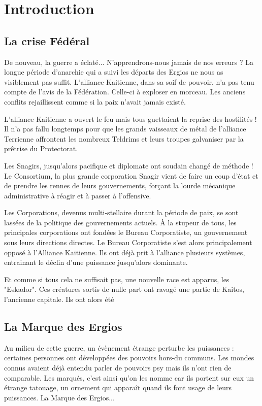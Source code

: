 \chapter*{Introduction}

\begin{multicols*}{2}

\section*{La crise Fédéral}

De nouveau, la guerre a éclaté... N'apprendrons-nous jamais de nos erreurs ? La longue période d'anarchie qui a suivi les départs des Ergios ne nous as visiblement pas suffit. L'alliance Kaitienne, dans sa soif de pouvoir, n'a pas tenu compte de l'avis de la Fédération. Celle-ci à exploser en morceau. Les anciens conflits rejaillissent comme si la paix n'avait jamais existé.

L'alliance Kaitienne a ouvert le feu mais tous guettaient la reprise des hostilités ! Il n'a pas fallu longtemps pour que les grands vaisseaux de métal de l'alliance Terrienne affrontent les nombreux Teldrims et leurs troupes galvaniser par la prêtrise du Protectorat.

Les Snagirs, jusqu'alors pacifique et diplomate ont soudain changé de méthode ! Le Consortium, la plus grande corporation Snagir vient de faire un coup d'état et de prendre les rennes de leurs gouvernements, forçant la lourde mécanique administrative à réagir et à passer à l'offensive.

Les Corporations, devenus multi-stellaire durant la période de paix, se sont lassées de la politique des gouvernements actuels. À la stupeur de tous, les principales corporations ont fondées le Bureau Corporatiste, un gouvernement sous leurs directions directes. Le Bureau Corporatiste s'est alors principalement opposé à l'Alliance Kaitienne. Ils ont déjà prit à l'alliance plusieurs systèmes, entrainant le déclin d'une puissance jusqu'alors dominante.

Et comme si tous cela ne suffisait pas, une nouvelle race est apparus, les "Eskador". Ces créatures sortis de nulle part ont ravagé une partie de Kaitos, l'ancienne capitale. Ils ont alors été 

\section*{La Marque des Ergios}

Au milieu de cette guerre, un évènement étrange perturbe les puissances : certaines personnes ont développées des pouvoirs hors-du communs. Les mondes connus avaient déjà entendu parler de pouvoirs psy mais ils n'ont rien de comparable. Les marqués, c'est ainsi qu'on les nomme car ils portent sur eux un étrange tatouage, un ornement qui apparaît quand ils font usage de leurs puissances. La Marque des Ergios... 


\end{multicols*}
